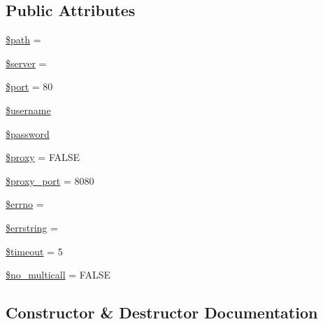 \subsection*{Public Attributes}
\begin{DoxyCompactItemize}
\item 
\mbox{\hyperlink{class_x_m_l___r_p_c___client_a0a4baf0b22973c07685c3981f0d17fc4}{\$path}} = \textquotesingle{}\textquotesingle{}
\item 
\mbox{\hyperlink{class_x_m_l___r_p_c___client_ad135cc8a47e55f0829949cf62214170f}{\$server}} = \textquotesingle{}\textquotesingle{}
\item 
\mbox{\hyperlink{class_x_m_l___r_p_c___client_aa0787efab4b22e8a212882f3409d4c77}{\$port}} = 80
\item 
\mbox{\hyperlink{class_x_m_l___r_p_c___client_a0eb82aa5f81cf845de4b36cd653c42cf}{\$username}}
\item 
\mbox{\hyperlink{class_x_m_l___r_p_c___client_a607686ef9f99ea7c42f4f3dd3dbb2b0d}{\$password}}
\item 
\mbox{\hyperlink{class_x_m_l___r_p_c___client_a01564a63e754b8037a987f7f8fde0e6d}{\$proxy}} = F\+A\+L\+SE
\item 
\mbox{\hyperlink{class_x_m_l___r_p_c___client_a778054bf2337c6516bdad84294329511}{\$proxy\+\_\+port}} = 8080
\item 
\mbox{\hyperlink{class_x_m_l___r_p_c___client_a2be10a914e39a6b1f855ddf3b9a21367}{\$errno}} = \textquotesingle{}\textquotesingle{}
\item 
\mbox{\hyperlink{class_x_m_l___r_p_c___client_ac0e00fea1b952868a67648a9442a58da}{\$errstring}} = \textquotesingle{}\textquotesingle{}
\item 
\mbox{\hyperlink{class_x_m_l___r_p_c___client_a84320a9bf3e591d7ae20dfcb0dfe6a0d}{\$timeout}} = 5
\item 
\mbox{\hyperlink{class_x_m_l___r_p_c___client_a77b58d3e00e1054158dc707e34334497}{\$no\+\_\+multicall}} = F\+A\+L\+SE
\end{DoxyCompactItemize}


\subsection{Constructor \& Destructor Documentation}
\mbox{\label{class_x_m_l___r_p_c___client_ab665c9b62c100416c6c1e20ec650f553}} 
